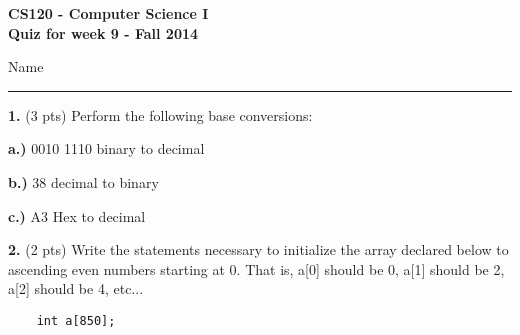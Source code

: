 \documentclass[11pt]{article}
\begin{document}
\begin{center}
\large
\bf
{\sffamily CS120 - Computer Science I\\
           Quiz for week 9 - Fall   2014}
\end{center}
\normalsize
Name \rule{2.5in}{.015in}

\normalsize

{\bf 1. } (3  pts) Perform the following base conversions: 

{\bf a.)}  0010 1110 binary to decimal 

\vspace{1.0in}

{\bf b.)} 38 decimal to binary

\vspace{1.0in}
{\bf c.)} A3 Hex to decimal

\vspace{1.0in}

{\bf 2.} (2 pts) Write the statements necessary to initialize the array
declared below to ascending even numbers starting at 0. That is, a[0] should be 0, a[1] should
be 2, a[2] should be 4, etc...

\begin{verbatim}
    int a[850];
\end{verbatim}
\end{document}
